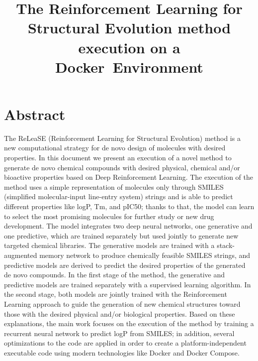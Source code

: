 \documentclass[a4paper]{article}
\begin{document}
\title{The Reinforcement Learning for Structural Evolution method execution on a Docker Environment}


\author{
}
\date{} %

\maketitle

\section*{Abstract}
The ReLeaSE (Reinforcement Learning for Structural Evolution) method is a new computational strategy for de novo design of molecules with desired properties.
In this document we present an execution of a novel method to generate de novo chemical compounds with desired physical, chemical and/or bioactive properties based on Deep Reinforcement Learning. The execution of the method uses a simple representation of molecules only through SMILES (simplified molecular-input line-entry system) strings and is able to predict different properties like logP, Tm, and pIC50; thanks to that, the model can learn to select the most promising molecules for further study or new drug development. 
The model integrates two deep neural networks, one generative and one predictive, which are trained separately but used jointly to generate new targeted chemical libraries. The generative models are trained with a stack-augmented memory network to produce chemically feasible SMILES strings, and predictive models are derived to predict the desired properties of the generated de novo compounds. In the first stage of the method, the generative and predictive models are trained separately with a supervised learning algorithm. In the second stage, both models are jointly trained with the Reinforcement Learning approach to guide the generation of new chemical structures toward those with the desired physical and/or biological properties.
Based on these explanations, the main work focuses on the execution of the method by training a recurrent neural network to predict logP from SMILES; in addition, several optimizations to the code are applied in order to create a platform-independent executable code using modern technologies like Docker and Docker Compose.
\end{document}
